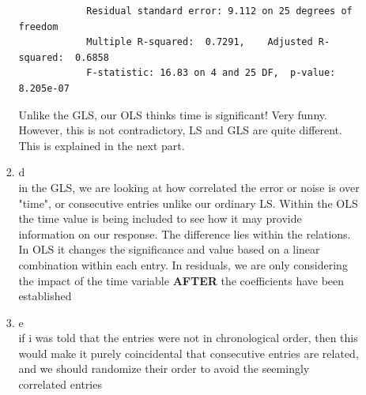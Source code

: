 \documentclass[11pt]{article}
\begin{document}
\begin{enumerate}
\begin{enumerate}
\begin{enumerate}
\begin{verbatim}
			Residual standard error: 9.112 on 25 degrees of freedom
			Multiple R-squared:  0.7291,	Adjusted R-squared:  0.6858 
			F-statistic: 16.83 on 4 and 25 DF,  p-value: 8.205e-07
		\end{verbatim}
		Unlike the GLS, our OLS thinks time is significant! Very funny. However, this is not contradictory, LS and GLS are quite different. This is explained in the next part.
		\item d \\ in the GLS, we are looking at how correlated the error or noise is over "time", or consecutive entries unlike our ordinary LS. Within the OLS the time value is being included to see how it may provide information on our response. The difference lies within the relations. In OLS it changes the significance and value based on a linear combination within each entry. In residuals, we are only considering the impact of the time variable \textbf{AFTER} the coefficients have been established
		\item e\\if i was told that the entries were not in chronological order, then this would make it purely coincidental that consecutive entries are related, and we should randomize their order to avoid the seemingly correlated entries
	\end{enumerate}
\end{enumerate}
\end{enumerate}
\end{document}
